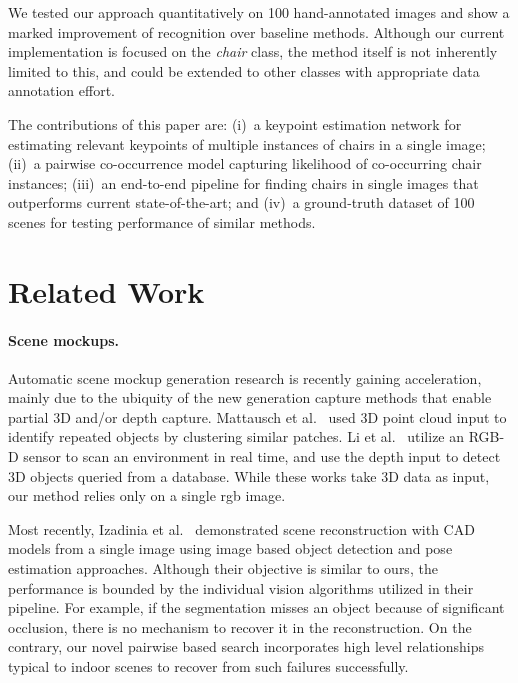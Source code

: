 \documentclass[10pt,twocolumn,letterpaper]{article}
\begin{document}
We tested our approach quantitatively on 100 hand-annotated images and show a
marked improvement of recognition over baseline methods. Although our current
implementation is focused on the \emph{chair} class, the method itself is not
inherently limited to this, and could be extended to other classes with
appropriate data annotation effort.

%
The contributions of this paper are:
%
(i)~a keypoint estimation network for estimating relevant keypoints of
          multiple instances of chairs in a single image; 
(ii)~a pairwise co-occurrence model capturing likelihood of co-occurring
          chair instances; 
(iii)~an end-to-end pipeline for finding chairs in single images
          that outperforms current state-of-the-art; and 
(iv)~a ground-truth dataset of 100 scenes for testing performance of similar methods.

\section{Related Work}
\label{sec:related}

\paragraph{Scene mockups.} Automatic scene mockup generation research is recently
gaining acceleration, mainly due to the ubiquity of the new generation capture
methods that enable partial 3D and/or depth capture.
Mattausch et al.~\cite{Mattausch:2014:CGF} used 3D point cloud input to identify
repeated objects by clustering similar patches. Li et al.~\cite{Li:2015:CGF}
utilize an RGB-D sensor to scan an environment in real time, and use the depth
input to detect 3D objects queried from a database. While these works take
3D data as input, our method relies only on a single rgb image.

Most recently, Izadinia et al.~\cite{Izadinia:2016:Arxiv} demonstrated
scene reconstruction with CAD models from a single image using image based
object detection and pose estimation approaches. Although their objective is
similar to ours, the performance is bounded by the individual vision algorithms
utilized in their pipeline. For example, if the segmentation misses an object
because of significant occlusion, there is no mechanism to recover it in the
reconstruction. On the contrary, our novel pairwise based search incorporates
high level relationships typical to indoor scenes to recover from such failures
successfully.
\end{document}
